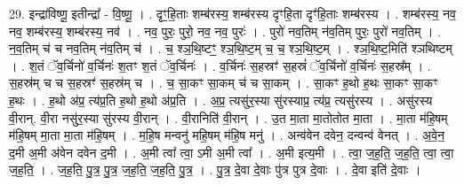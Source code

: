 \documentclass[17pt]{extarticle}
\begin{document}
29. इन्द्रा॑विष्णू॒ इतीन्द्रा᳚ - वि॒ष्णू॒ । . दृꣳ॒॒हि॒ताः शम्ब॑रस्य॒ शम्ब॑रस्य दृꣳहि॒ता दृꣳ॑हि॒ताः शम्ब॑रस्य । . शम्ब॑रस्य॒ नव॒ नव॒ शम्ब॑रस्य॒ शम्ब॑रस्य॒ नव॑ । . नव॒ पुरः॒ पुरो॒ नव॒ नव॒ पुरः॑ । . पुरो॑ नव॒तिम् न॑व॒तिम् पुरः॒ पुरो॑ नव॒तिम् । . न॒व॒तिम् च॑ च नव॒तिम् न॑व॒तिम् च॑ । . च॒ श्ञ॒थि॒ष्टꣳ॒॒ श्ञ॒थि॒ष्ट॒म् च॒ च॒ श्ञ॒थि॒ष्ट॒म् । . श्ञ॒थि॒ष्ट॒मिति॑ श्ञथिष्टम् । . श॒तं ॅव॒र्चिनो॑ व॒र्चिनः॑ श॒तꣳ श॒तं ॅव॒र्चिनः॑ । . व॒र्चिनः॑ स॒हस्रꣳ॑ स॒हस्रं॑ ॅव॒र्चिनो॑ व॒र्चिनः॑ स॒हस्र᳚म् । . स॒हस्र॑म् च च स॒हस्रꣳ॑ स॒हस्र॑म् च । . च॒ सा॒कꣳ सा॒कम् च॑ च सा॒कम् । . सा॒कꣳ ह॒थो ह॒थः सा॒कꣳ सा॒कꣳ ह॒थः । . ह॒थो अ॑प्र॒ त्य॑प्र॒ति ह॒थो ह॒थो अ॑प्र॒ति । . अ॒प्र॒ त्यसु॑र॒स्या सु॑रस्याप्र॒ त्य॑प्र॒ त्यसु॑रस्य । . असु॑रस्य वी॒रान्. वी॒रा नसु॑र॒स्या सु॑रस्य वी॒रान् । . वी॒रानिति॑ वी॒रान् । . उ॒त मा॒ता मा॒तोतोत मा॒ता । . मा॒ता म॑हि॒षम् म॑हि॒षम् मा॒ता मा॒ता म॑हि॒षम् । . म॒हि॒ष मन्वनु॑ महि॒षम् म॑हि॒ष मनु॑ । . अन्व॑वेन दवेन॒ दन्वन्व॑ वेनत् । . अ॒वे॒न॒ द॒मी अ॒मी अ॑वेन दवेन द॒मी । . अ॒मी त्वा᳚ त्वा॒ ऽमी अ॒मी त्वा᳚ । . अ॒मी इत्य॒मी । . त्वा॒ ज॒ह॒ति॒ ज॒ह॒ति॒ त्वा॒ त्वा॒ ज॒ह॒ति॒ । . ज॒ह॒ति॒ पु॒त्र॒ पु॒त्र॒ ज॒ह॒ति॒ ज॒ह॒ति॒ पु॒त्र॒ । . पु॒त्र॒ दे॒वा दे॒वाः पु॑त्र पुत्र दे॒वाः । . दे॒वा इति॑ दे॒वाः । \newline
\end{document}
